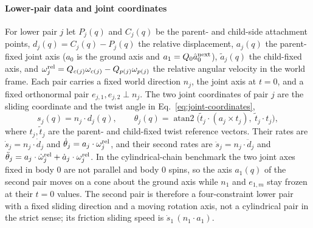 \documentclass[preprint,12pt]{elsarticle}
\begin{document}
\paragraph{Lower-pair data and joint coordinates}
For lower pair $j$ let $P_j(q)$ and $C_j(q)$ be the parent- and child-side
attachment points, $d_j(q)=C_j(q)-P_j(q)$ the relative displacement,
$a_j(q)$ the parent-fixed joint axis ($a_0$ is the ground axis and
$a_1=Q_0\hat a^{\rm next}_0$), $\tilde a_j(q)$ the child-fixed axis, and
$\omega^{\rm rel}_j=Q_{c(j)}\omega_{c(j)}-Q_{p(j)}\omega_{p(j)}$ the
relative angular velocity in the world frame. Each pair carries a fixed world
direction $n_j$, the joint axis at $t=0$, and a fixed orthonormal pair
$e_{j,1},e_{j,2}\perp n_j$. The two joint coordinates of pair $j$ are the
sliding coordinate and the twist angle in Eq.~\eqref{eq:joint-coordinates},
\begin{equation}
  s_j(q)=n_j\cdot d_j(q),\qquad
  \theta_j(q)=\operatorname{atan2}\bigl(\tilde t_j\cdot(a_j\times t_j),\
  \tilde t_j\cdot t_j\bigr),
  \label{eq:joint-coordinates}
\end{equation}
where $t_j,\tilde t_j$ are the parent- and child-fixed twist reference
vectors. Their rates are $\dot s_j=n_j\cdot\dot d_j$ and
$\dot\theta_j=a_j\cdot\omega^{\rm rel}_j$, and their second rates are
$\ddot s_j=n_j\cdot\ddot d_j$ and
$\ddot\theta_j=a_j\cdot\dot\omega^{\rm rel}_j+\dot a_j\cdot\omega^{\rm rel}_j$.
In the cylindrical-chain benchmark the two joint axes fixed in body $0$ are
not parallel and body $0$ spins, so the axis $a_1(q)$ of the second pair moves on a cone about
the ground axis while $n_1$ and $e_{1,m}$ stay frozen at their $t=0$ values.
The second pair is therefore a four-constraint lower pair with a fixed
sliding direction and a moving rotation axis, not a cylindrical pair in the
strict sense; its friction sliding speed is $\dot s_1\,(n_1\cdot a_1)$.
\end{document}
